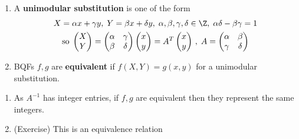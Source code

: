 \documentclass{article}
\begin{document}
\begin{defi}
    \leavevmode
    \begin{enumerate}[label=(\arabic*)]
        \item A \textbf{unimodular substitution} is one of the form
            \begin{gather*}
                X = \alpha x + \gamma y, \; Y = \beta x + \delta y, \; \alpha, \beta, \gamma, \delta \in \Z, \; \alpha \delta - \beta \gamma = 1 \\
                \text{so} \;
                \begin{pmatrix}
                    X \\ Y
                \end{pmatrix}
                =
                \begin{pmatrix}
                    \alpha & \gamma \\ \beta & \delta
                \end{pmatrix}
                \begin{pmatrix}
                    x \\ y
                \end{pmatrix}
                = A^T
                \begin{pmatrix}
                    x \\ y
                \end{pmatrix}
                \, , \;
                A =
                \begin{pmatrix}
                    \alpha & \beta \\ \gamma & \delta
                \end{pmatrix}
            \end{gather*}
        \item BQFs $f, g$ are \textbf{equivalent} if $f(X, Y) = g(x, y)$ for a unimodular substitution.
    \end{enumerate}
\end{defi}

\begin{remark}
    \leavevmode
    \begin{enumerate}[label=(\arabic*)]
        \item As $A^{-1}$ has integer entries, if $f, g$ are equivalent then they represent the same integers.
        \item (Exercise) This is an equivalence relation
    \end{enumerate}
\end{remark}
\end{document}
